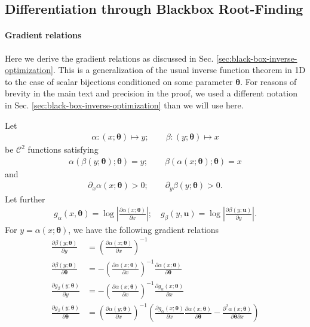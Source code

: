 \subsection{Differentiation through Blackbox Root-Finding}

\paragraph{Gradient relations}
Here we derive the gradient relations as discussed in Sec. \ref{sec:black-box-inverse-optimization}. This is a generalization of the usual inverse function theorem in 1D to the case of scalar bijections conditioned on some parameter $\bm \theta$. For reasons of brevity in the main text and precision in the proof, we used a different notation in Sec. \ref{sec:black-box-inverse-optimization} than we will use here. 
\begin{theorem}
\label{thm:backward-gradients}
Let 
\begin{align*}
    \alpha \colon (x; \bm \theta) \mapsto y; \qquad
    \beta \colon (y; \bm \theta) \mapsto x
\end{align*}
be $\mathcal{C}^{2}$ functions satisfying
\begin{align} \label{eq:inverse-condition}
    \alpha(\beta(y; \bm \theta); \bm \theta) = y; \qquad
    \beta(\alpha(x; \bm \theta); \bm \theta) = x
\end{align}
and 
\begin{align}
    \partial_{x} \alpha(x; \bm \theta) > 0; \qquad
    \partial_{y} \beta(y; \bm \theta) > 0.
\end{align}
Let further
\begin{align}
    g_{\alpha}(x,\bm \theta) = \log \left| \frac{\partial \alpha(x; \bm \theta) }{\partial x } \right|; \quad g_{\beta}(y,\bm u) = \log \left| \frac{\partial \beta(y; \bm u) }{\partial y } \right|.
\end{align}
For $y = \alpha(x; \bm \theta)$, we have the following gradient relations
\begin{align}
    \frac{\partial \beta(y; \bm \theta)}{\partial y} &= \left(\frac{\partial \alpha(x; \bm \theta)}{\partial x}\right)^{-1} \label{eq:grad-out-in} \\
    \frac{\partial \beta(y; \bm \theta)}{\partial \bm \theta} &= - \left(\frac{\partial \alpha(x; \bm \theta)}{\partial x}\right)^{-1} \frac{\partial \alpha(x; \bm \theta)}{\partial \bm \theta} \label{eq:grad-out-param} \\
    \frac{\partial g_{\beta}(y; \bm \theta)}{\partial y} &= - \left(\frac{\partial \alpha(x; \bm \theta)}{\partial x}\right)^{-1} \frac{\partial g_{\alpha}(x; \bm \theta)}{\partial x} \label{eq:grad-density-in} \\
    \frac{\partial g_{\beta}(y; \bm \theta)}{\partial \bm \theta} &= \left(\frac{\partial \alpha(y; \bm \theta)}{\partial x}\right)^{-1} \left(  \frac{\partial g_{\alpha}(x; \bm \theta)}{\partial x} \frac{\partial \alpha(x; \bm \theta)}{\partial \bm \theta} - \frac{\partial^{2} \alpha(x; \bm \theta)}{\partial \bm \theta \partial x} \right) \label{eq:grad-density-param}
\end{align}
\end{theorem}
